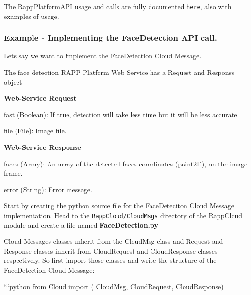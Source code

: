 The Rapp\-Platform\-A\-P\-I usage and calls are fully documented \href{https://github.com/rapp-project/rapp-api/tree/master/python/RappCloud}{\tt here}, also with examples of usage.





\subsubsection*{Example -\/ Implementing the Face\-Detection A\-P\-I call.}

Lets say we want to implement the {\ttfamily Face\-Detection} Cloud Message.

The face detection R\-A\-P\-P Platform Web Service has a Request and Response object

{\bfseries Web-\/\-Service Request}


\begin{DoxyItemize}
\item {\ttfamily fast} (Boolean)\-: If true, detection will take less time but it will be less accurate
\item {\ttfamily file} (File)\-: Image file.
\end{DoxyItemize}

{\bfseries Web-\/\-Service Response}


\begin{DoxyItemize}
\item {\ttfamily faces} (Array)\-: An array of the detected faces coordinates (point2\-D), on the image frame.
\item {\ttfamily error} (String)\-: Error message.
\end{DoxyItemize}

Start by creating the python source file for the Face\-Deteciton Cloud Message implementation. Head to the \href{https://github.com/rapp-project/rapp-api/tree/master/python/RappCloud/CloudMsgs}{\tt Rapp\-Cloud/\-Cloud\-Msgs} directory of the Rapp\-Cloud module and create a file named {\bfseries Face\-Detection.\-py}

Cloud Messages classes inherit from the {\ttfamily Cloud\-Msg} class and {\ttfamily Request} and {\ttfamily Response} classes inherit from {\ttfamily Cloud\-Request} and {\ttfamily Cloud\-Response} classes respectively. So first import those classes and write the structure of the {\ttfamily Face\-Detection} Cloud Message\-:

```python from Cloud import ( Cloud\-Msg, Cloud\-Request, Cloud\-Response)

